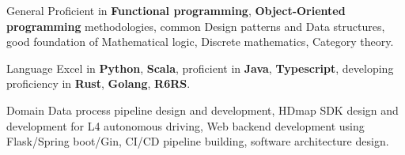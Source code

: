 

\begin{cvskills}

  \cvskill
  {General}
  {Proficient in \textbf{Functional programming}, \textbf{Object-Oriented programming} methodologies, common Design patterns and Data structures, good foundation of Mathematical logic, Discrete mathematics, Category theory.}
  
  \cvskill
  {Language}
  {Excel in \textbf{Python}, \textbf{Scala}, proficient in \textbf{Java}, \textbf{Typescript}, developing proficiency in \textbf{Rust}, \textbf{Golang}, \textbf{R6RS}.}
  
  \cvskill
  {Domain}
  {Data process pipeline design and development, HDmap SDK design and development for L4 autonomous driving, Web backend development using Flask/Spring boot/Gin, CI/CD pipeline building, software architecture design.}

\end{cvskills}
